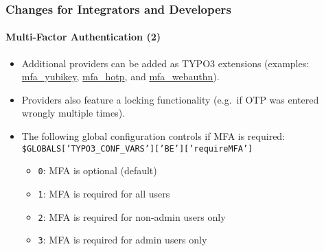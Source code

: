 %

\begin{frame}[fragile]
	\frametitle{Changes for Integrators and Developers}
	\framesubtitle{Multi-Factor Authentication (2)}

	\begin{itemize}

		\item Additional providers can be added as TYPO3 extensions\newline
			\smaller
				(examples:
				\href{https://github.com/derhansen/mfa_yubikey}{mfa\_yubikey},
				\href{https://github.com/o-ba/mfa_hotp}{mfa\_hotp}, and
				\href{https://github.com/bnf/mfa_webauthn}{mfa\_webauthn}).
			\normalsize

		\item Providers also feature a locking functionality
			(e.g.\ if OTP was entered wrongly multiple times).

		\item The following global configuration controls if MFA is required:\newline
			\smaller\texttt{\$GLOBALS['TYPO3\_CONF\_VARS']['BE']['requireMFA']}\normalsize

			\begin{itemize}
				\item \texttt{0}: MFA is optional (default)
				\item \texttt{1}: MFA is required for all users
				\item \texttt{2}: MFA is required for non-admin users only
				\item \texttt{3}: MFA is required for admin users only
			\end{itemize}

	\end{itemize}

\end{frame}

